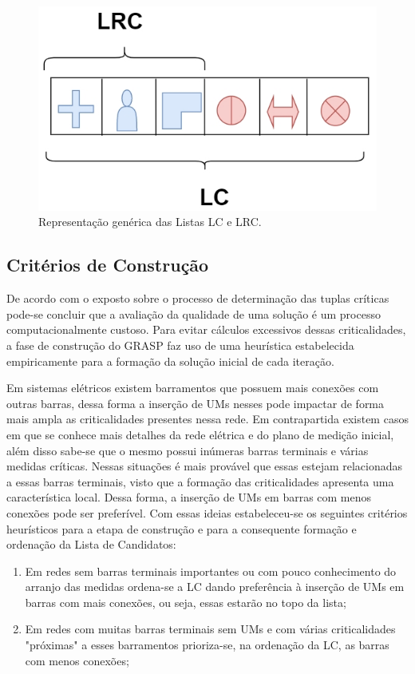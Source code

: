 \documentclass[12pt]{article}
\begin{document}
\begin{figure}[H]
	\centering 
	\includegraphics[scale=0.5]{figuras/LC_LRC.jpg}
	\caption{Representação genérica das Listas LC e LRC.}
	\label{fig8} %
\end{figure}

\subsection{Critérios de Construção}

De acordo com o exposto sobre o processo de determinação das tuplas críticas pode-se concluir que a avaliação da qualidade de uma solução é um processo computacionalmente custoso. Para evitar cálculos excessivos dessas criticalidades, a fase de construção do GRASP faz uso de uma heurística estabelecida empiricamente para a formação da solução inicial de cada iteração.

Em sistemas elétricos existem barramentos que possuem mais conexões com outras barras, dessa forma a inserção de UMs nesses pode impactar de forma mais ampla as criticalidades presentes nessa rede. Em contrapartida existem casos em que se conhece  mais detalhes da rede elétrica e do plano de medição inicial, além disso sabe-se que o mesmo possui inúmeras barras terminais e várias medidas críticas. Nessas situações é mais provável que essas estejam relacionadas a essas barras terminais, visto que a formação das criticalidades apresenta uma característica local. Dessa forma, a inserção de UMs em barras com menos conexões pode ser preferível. Com essas ideias estabeleceu-se os seguintes critérios heurísticos para a etapa de construção e para a consequente formação e ordenação da Lista de Candidatos:

\begin{enumerate}
	\item Em redes sem barras terminais importantes ou com pouco conhecimento do arranjo das medidas ordena-se a LC dando preferência à inserção de UMs em barras com mais conexões, ou seja, essas estarão no topo da lista;
	
	\item Em redes com muitas barras terminais sem UMs e com várias criticalidades "próximas" a esses barramentos prioriza-se, na ordenação da LC, as barras com menos conexões;
	
\end{enumerate} 
\end{document}

